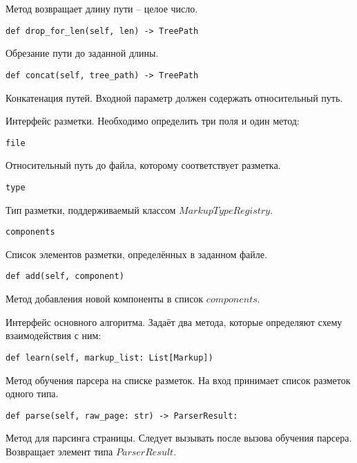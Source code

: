 Метод возвращает длину пути -- целое число.
\\

\begin{lstlisting}
def drop_for_len(self, len) -> TreePath
\end{lstlisting}

Обрезание пути до заданной длины.
\\

\begin{lstlisting}
def concat(self, tree_path) -> TreePath
\end{lstlisting}

Конкатенация путей. Входной параметр должен содержать относительный путь.
\\


Интерфейс разметки. Необходимо определить три поля и один метод:
\\

\begin{lstlisting}
file
\end{lstlisting}

Относительный путь до файла, которому соответствует разметка.
\\

\begin{lstlisting}
type
\end{lstlisting}

Тип разметки, поддерживаемый классом $MarkupTypeRegistry$.
\\

\begin{lstlisting}
components
\end{lstlisting}

Список элементов разметки, определённых в заданном файле.
\\

\begin{lstlisting}
def add(self, component)
\end{lstlisting}

Метод добавления новой компоненты в список $components$.
\\



Интерфейс основного алгоритма. Задаёт два метода, которые определяют схему взаимодействия с ним:
\\

\begin{lstlisting}
def learn(self, markup_list: List[Markup])
\end{lstlisting}

Метод обучения парсера на списке разметок. На вход принимает список разметок одного типа.
\\

\begin{lstlisting}
def parse(self, raw_page: str) -> ParserResult:
\end{lstlisting}

Метод для парсинга страницы. Следует вызывать после вызова обучения парсера. Возвращает элемент типа $ParserResult$.
